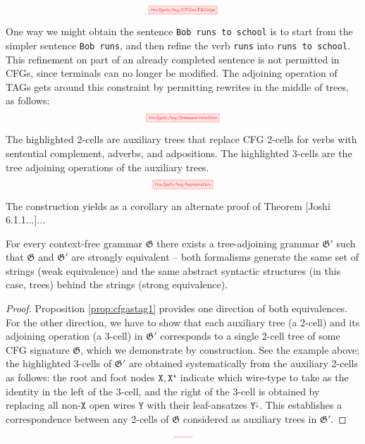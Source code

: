 \begin{fullwidth}
\begin{example}
\[\scalebox{0.5}{\tikzfig{tree2gate/tag/CFGasTAGsign}}\]
\end{example}

\begin{example}
One way we might obtain the sentence \texttt{Bob runs to school} is to start from the simpler sentence \texttt{Bob runs}, and then refine the verb \texttt{runs} into \texttt{runs to school}. This refinement on part of an already completed sentence is not permitted in CFGs, since terminals can no longer be modified. The adjoining operation of TAGs gets around this constraint by permitting rewrites in the middle of trees, as follows:
\[\scalebox{0.5}{\tikzfig{tree2gate/tag/3compareintuition}}\]
\end{example}

\begin{example}
The highlighted 2-cells are auxiliary trees that replace CFG 2-cells for verbs with sentential complement, adverbs, and adpositions. The highlighted 3-cells are the tree adjoining operations of the auxiliary trees.
\[\scalebox{0.5}{\tikzfig{tree2gate/tag/tagsignature}}\]
\end{example}

The construction yields as a corollary an alternate proof of Theorem [Joshi 6.1.1...]...

\begin{corollary}
For every context-free grammar $\mathfrak{G}$ there exists a tree-adjoining grammar $\mathfrak{G}'$ such that $\mathfrak{G}$ and $\mathfrak{G}'$ are strongly equivalent -- both formalisms generate the same set of strings (weak equivalence) and the same abstract syntactic structures (in this case, trees) behind the strings (strong equivalence).
\begin{proof}
Proposition \ref{prop:cfgastag1} provides one direction of both equivalences. For the other direction, we have to show that each auxiliary tree (a 2-cell) and its adjoining operation (a 3-cell) in $\mathfrak{G}'$ corresponds to a single 2-cell tree of some CFG signature $\mathfrak{G}$, which we demonstrate by construction. See the example above; the highlighted 3-cells of $\mathfrak{G}'$ are obtained systematically from the auxiliary 2-cells as follows: the root and foot nodes $\texttt{X},\texttt{X}^\star$ indicate which wire-type to take as the identity in the left of the 3-cell, and the right of the 3-cell is obtained by replacing all non-$\texttt{X}$ open wires $\texttt{Y}$ with their leaf-ansatzes $\texttt{Y}^\downarrow$. This establishes a correspondence between any 2-cells of $\mathfrak{G}$ considered as auxiliary trees in $\mathfrak{G}'$.
\end{proof}
\end{corollary}

\[\scalebox{0.1}{\tikzfig{tree2gate/workedexample/bigexaltogether}}\]

\end{fullwidth}